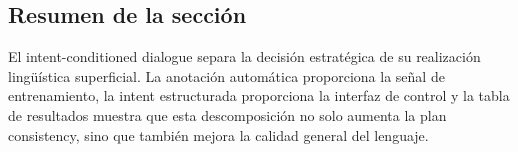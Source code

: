 \subsection{Resumen de la sección}

El intent-conditioned dialogue separa la decisión estratégica de su realización lingüística superficial. La anotación automática proporciona la señal de entrenamiento, la intent estructurada proporciona la interfaz de control y la tabla de resultados muestra que esta descomposición no solo aumenta la plan consistency, sino que también mejora la calidad general del lenguaje.
